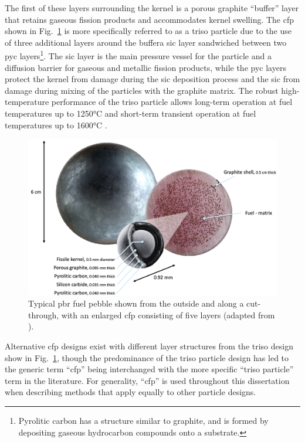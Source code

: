 The first of these layers surrounding the kernel is a porous graphite ``buffer'' layer that retains gaseous fission products and accommodates kernel swelling. The \gls{cfp} shown in Fig.\ \ref{fig:pbr_fuel} is more specifically referred to as a \gls{triso} particle due to the use of three additional layers around the buffer\mdash a \gls{sic} layer sandwiched between two \gls{pyc} layers\hspace{0.02cm}\footnote{Pyrolitic carbon has a structure similar to graphite, and is formed by depositing gaseous hydrocarbon compounds onto a substrate.}. The \gls{sic} layer is the main pressure vessel for the particle and a diffusion barrier for gaseous and metallic fission products, while the \gls{pyc} layers protect the kernel from damage during the \gls{sic} deposition process and the \gls{sic} from damage during mixing of the particles with the graphite matrix. The robust high-temperature performance of the \gls{triso} particle allows long-term operation at fuel temperatures up to 1250\si{\celsius} and short-term transient operation at fuel temperatures up to 1600\si{\celsius} \cite{nabielek,demkowicz}.

\begin{figure}[!h]
\centering
\includegraphics[width=0.6\linewidth]{figs/pbr_fuel.png}
\caption{Typical \gls{pbr} fuel pebble shown from the outside and along a cut-through, with an enlarged \gls{cfp} consisting of five layers (adapted from \cite{x_energy_pebble}).}
\label{fig:pbr_fuel}
\end{figure}

Alternative \gls{cfp} designs exist with different layer structures from the \gls{triso} design show in Fig.\ \ref{fig:pbr_fuel}, though the predominance of the \gls{triso} particle design has led to the generic term ``\gls{cfp}'' being interchanged with the more specific ``\gls{triso} particle'' term in the literature. For generality, ``\gls{cfp}'' is used throughout this dissertation when describing methods that apply equally to other particle designs.

